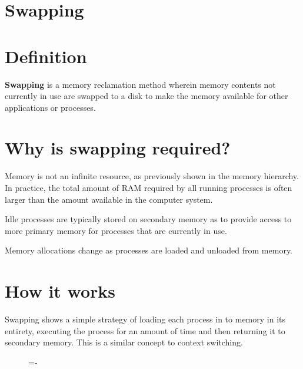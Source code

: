 \documentclass[a4paper]{systems-software}
\begin{document}
\section{Swapping}

\section*{Definition}

\textbf{Swapping} is a memory reclamation method wherein memory contents not currently in use are swapped to a disk to make the memory available for other applications or processes.


\section*{Why is swapping required?}

Memory is not an infinite resource, as previously shown in the memory hierarchy. In practice, the total amount of RAM required by all running processes is often larger than the amount available in the computer system.

Idle processes are typically stored on secondary memory as to provide access to more primary memory for processes that are currently in use.

Memory allocations change as processes are loaded and unloaded from memory.


\section*{How it works}

Swapping shows a simple strategy of loading each process in to memory in its entirety, executing the process for an amount of time and then returning it to secondary memory. This is a similar concept to context switching.

\begin{figure}[H]
  \lineskip=-\fboxrule
\end{figure}
\end{document}
